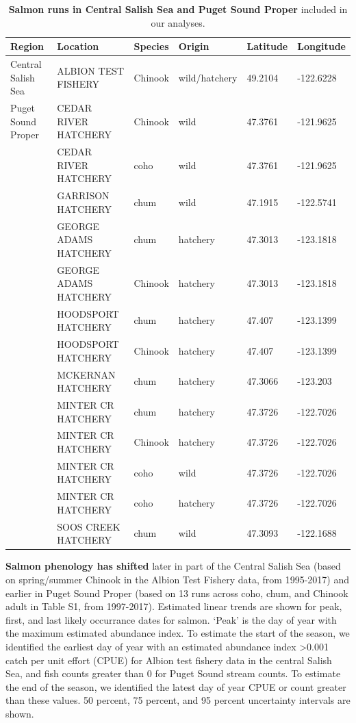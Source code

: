 \documentclass{article}
\begin{document}
\begin{table}[ht]
\centering
\caption{\textbf{Salmon runs in Central Salish Sea and Puget Sound Proper} included in our analyses.} 
\label{tab:salmon}
\begingroup\footnotesize
\begin{tabular}{|p{}|p{}|p{}|p{}|p{}|p{}|}
  \hline
Region & Location & Species & Origin & Latitude & Longitude \\ 
  \hline
Central Salish Sea & ALBION TEST FISHERY & Chinook & wild/hatchery & 49.2104 & -122.6228 \\ 
   \hline
Puget Sound Proper & CEDAR RIVER HATCHERY & Chinook & wild & 47.3761 & -121.9625 \\ 
   & CEDAR RIVER HATCHERY & coho & wild & 47.3761 & -121.9625 \\ 
   & GARRISON HATCHERY & chum & wild & 47.1915 & -122.5741 \\ 
   & GEORGE ADAMS HATCHERY & chum & hatchery & 47.3013 & -123.1818 \\ 
   & GEORGE ADAMS HATCHERY & Chinook & hatchery & 47.3013 & -123.1818 \\ 
   & HOODSPORT HATCHERY & chum & hatchery & 47.407 & -123.1399 \\ 
   & HOODSPORT HATCHERY & Chinook & hatchery & 47.407 & -123.1399 \\ 
   & MCKERNAN HATCHERY & chum & hatchery & 47.3066 & -123.203 \\ 
   & MINTER CR HATCHERY & chum & hatchery & 47.3726 & -122.7026 \\ 
   & MINTER CR HATCHERY & Chinook & hatchery & 47.3726 & -122.7026 \\ 
   & MINTER CR HATCHERY & coho & wild & 47.3726 & -122.7026 \\ 
   & MINTER CR HATCHERY & coho & hatchery & 47.3726 & -122.7026 \\ 
   & SOOS CREEK HATCHERY & chum & wild & 47.3093 & -122.1688 \\ 
   \hline
\end{tabular}
\endgroup
\end{table}\begin{adjustwidth}{-4cm}{-2cm}
\begin{table}[ht]
\centering
\caption{\textbf{Salmon phenology has shifted} later in part of the Central Salish Sea (based on spring/summer Chinook in the Albion Test Fishery data, from 1995-2017) and earlier in Puget Sound Proper (based on 13 runs across coho, chum, and Chinook adult in Table S1, from 1997-2017). Estimated linear trends are shown for peak, first, and last likely occurrance dates for salmon.  `Peak' is the day of year with the maximum estimated abundance index.   To  estimate  the  start  of  the  season,  we  identified  the earliest day of year with an estimated abundance index >0.001 catch per unit effort (CPUE) for Albion test fishery data in the central Salish Sea, and fish counts greater than  0 for Puget Sound stream counts.  To estimate the end of the season, we identified the latest day of year CPUE or count greater than these values.  50 percent, 75 percent, and 95 percent uncertainty intervals are shown.} 

\end{table}
\end{adjustwidth}
\end{document}
